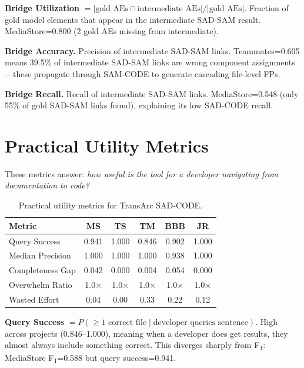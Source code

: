 \documentclass[11pt,a4paper]{report}
\newcommand{\sadcode}{SAD-CODE\xspace}
\newcommand{\sadsam}{SAD-SAM\xspace}
\newcommand{\samcode}{SAM-CODE\xspace}
\newcommand{\transarc}{TransArc\xspace}
\newcommand{\fone}{F\textsubscript{1}\xspace}
\begin{document}
\textbf{Bridge Utilization} $= |\text{gold AEs} \cap \text{intermediate AEs}| /
|\text{gold AEs}|$. Fraction of gold model elements that appear in the
intermediate \sadsam result. MediaStore=0.800 (2 gold AEs missing from
intermediate).

\textbf{Bridge Accuracy.} Precision of intermediate \sadsam links.
Teammates=0.605 means 39.5\% of intermediate \sadsam links are wrong
component assignments---these propagate through \samcode to generate
cascading file-level FPs.

\textbf{Bridge Recall.} Recall of intermediate \sadsam links. MediaStore=0.548
(only 55\% of gold \sadsam links found), explaining its low \sadcode recall.


\section{Practical Utility Metrics}
\label{sec:eval:utility}

These metrics answer: \emph{how useful is the tool for a developer navigating
from documentation to code?}

\begin{table}[h]
\caption{Practical utility metrics for \transarc \sadcode.}
\label{tab:utility}
\centering\small
\begin{tabular}{lccccc}
\toprule
\textbf{Metric} & \textbf{MS} & \textbf{TS} & \textbf{TM} & \textbf{BBB} & \textbf{JR} \\
\midrule
Query Success       & 0.941 & 1.000 & 0.846 & 0.902 & 1.000 \\
Median Precision    & 1.000 & 1.000 & 1.000 & 0.938 & 1.000 \\
Completeness Gap    & 0.042 & 0.000 & 0.004 & 0.054 & 0.000 \\
Overwhelm Ratio     & 1.0$\times$ & 1.0$\times$ & 1.0$\times$ & 1.0$\times$ & 1.0$\times$ \\
Wasted Effort       & 0.04  & 0.00  & 0.33  & 0.22  & 0.12 \\
\bottomrule
\end{tabular}
\end{table}

\textbf{Query Success} $= P(\geq 1 \text{ correct file} \mid
\text{developer queries sentence})$. High across projects (0.846--1.000),
meaning when a developer does get results, they almost always include
something correct. This diverges sharply from \fone: MediaStore \fone=0.588
but query success=0.941.
\end{document}
